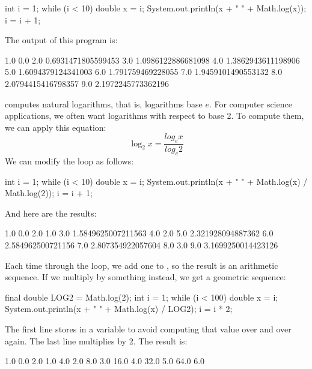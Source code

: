 \begin{code}
int i = 1;
while (i < 10) {
    double x = i;
    System.out.println(x + "   " + Math.log(x));
    i = i + 1;
}
\end{code}

The output of this program is:

\begin{stdout}
1.0   0.0
2.0   0.6931471805599453
3.0   1.0986122886681098
4.0   1.3862943611198906
5.0   1.6094379124341003
6.0   1.791759469228055
7.0   1.9459101490553132
8.0   2.0794415416798357
9.0   2.1972245773362196
\end{stdout}

 computes natural logarithms, that is, logarithms base $e$.
For computer science applications, we often want logarithms with respect to base 2.
To compute them, we can apply this equation:
%
\[ \log_2 x = \frac{log_e x}{log_e 2} \]
%
We can modify the loop as follows:

\begin{code}
int i = 1;
while (i < 10) {
    double x = i;
    System.out.println(x + "   " + Math.log(x) / Math.log(2));
    i = i + 1;
}
\end{code}

And here are the results:

\begin{stdout}
1.0   0.0
2.0   1.0
3.0   1.5849625007211563
4.0   2.0
5.0   2.321928094887362
6.0   2.584962500721156
7.0   2.807354922057604
8.0   3.0
9.0   3.1699250014423126
\end{stdout}

Each time through the loop, we add one to , so the result is an arithmetic sequence.
If we multiply  by something instead, we get a geometric sequence:

\begin{code}
final double LOG2 = Math.log(2);
int i = 1;
while (i < 100) {
    double x = i;
    System.out.println(x + "   " + Math.log(x) / LOG2);
    i = i * 2;
}
\end{code}


The first line stores  in a  variable to avoid computing that value over and over again.
The last line multiplies  by 2.
The result is:

\begin{stdout}
1.0   0.0
2.0   1.0
4.0   2.0
8.0   3.0
16.0   4.0
32.0   5.0
64.0   6.0
\end{stdout}

